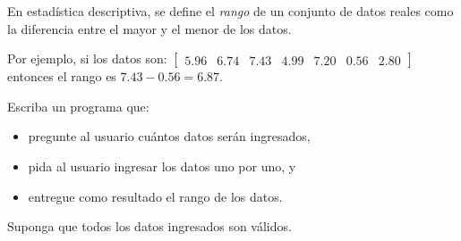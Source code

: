 En estadística descriptiva,
se define el \emph{rango} de un conjunto de datos reales
como la diferencia entre el mayor y el menor de los datos.

Por ejemplo, si los datos son:
\(
  \begin{bmatrix}
  5.96 & 6.74 & 7.43 & 4.99 & 7.20 & 0.56 & 2.80 
  \end{bmatrix}
\)
entonces el rango es \(7.43 - 0.56 = 6.87\).

\begin{minipage}[t]{.43\textwidth}
  Escriba un programa que:
  \begin{itemize}
    \item pregunte al usuario cuántos datos serán ingresados,
    \item pida al usuario ingresar los datos uno por uno, y
    \item entregue como resultado el rango de los datos.
  \end{itemize}
  Suponga que todos los datos ingresados son válidos.
\end{minipage}
\hfill
\begin{minipage}[t]{.45\textwidth}
  
\end{minipage}

